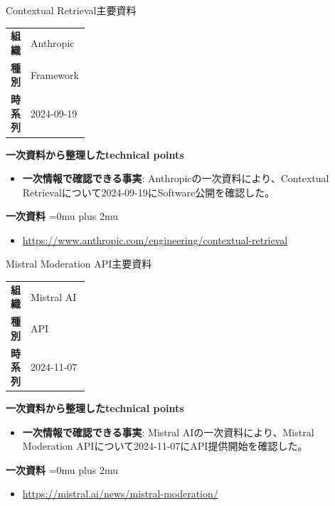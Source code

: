 \begin{technicalnote}{Contextual Retrieval}{主要資料}
\begingroup
\begin{tabularx}{\linewidth}{@{}>{\bfseries}p{0.22\linewidth}X@{}}
組織 & Anthropic \\
種別 & Framework \\
時系列 & 2024-09-19 \\
\end{tabularx}
\smallskip
{\bfseries 一次資料から整理したtechnical points}
\begin{itemize}[leftmargin=1.5em,itemsep=0.35em]
\item \textbf{一次情報で確認できる事実}: Anthropicの一次資料により、Contextual Retrievalについて2024-09-19にSoftware公開を確認した。
\end{itemize}
\begin{minipage}{\linewidth}
\begin{samepage}
{\bfseries 一次資料}
\begingroup\sloppy
\Urlmuskip=0mu plus 2mu\relax
\begin{itemize}[leftmargin=1.5em,itemsep=0.25em]
\item {\scriptsize\url{https://www.anthropic.com/engineering/contextual-retrieval}}
\end{itemize}
\endgroup
\end{samepage}
\end{minipage}
\endgroup
\end{technicalnote}
\medskip

\begin{technicalnote}{Mistral Moderation API}{主要資料}
\begingroup
\begin{tabularx}{\linewidth}{@{}>{\bfseries}p{0.22\linewidth}X@{}}
組織 & Mistral AI \\
種別 & API \\
時系列 & 2024-11-07 \\
\end{tabularx}
\smallskip
{\bfseries 一次資料から整理したtechnical points}
\begin{itemize}[leftmargin=1.5em,itemsep=0.35em]
\item \textbf{一次情報で確認できる事実}: Mistral AIの一次資料により、Mistral Moderation APIについて2024-11-07にAPI提供開始を確認した。
\end{itemize}
\begin{minipage}{\linewidth}
\begin{samepage}
{\bfseries 一次資料}
\begingroup\sloppy
\Urlmuskip=0mu plus 2mu\relax
\begin{itemize}[leftmargin=1.5em,itemsep=0.25em]
\item {\scriptsize\url{https://mistral.ai/news/mistral-moderation/}}
\end{itemize}
\endgroup
\end{samepage}
\end{minipage}
\endgroup
\end{technicalnote}
\medskip

